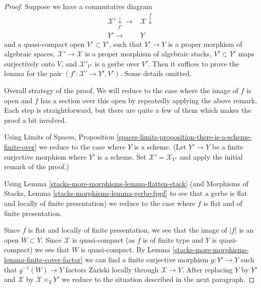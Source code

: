 \begin{proof}
Suppose we have a commutative diagram
$$
\begin{array}{cc}\mathcal{X}' \underset{f'}{\downarrow}\longrightarrow & \mathcal{X} \overset{f}{\downarrow} \\ Y' \longrightarrow & Y\end{array}
$$
and a quasi-compact open $V' \subset Y'$, such that
$Y' \to Y$ is a proper morphism of algebraic spaces,
$\mathcal{X}' \to \mathcal{X}$ is a proper morphism of algebraic stacks,
$V' \subset Y'$ maps surjectively onto $V$, and
$\mathcal{X}'_{V'}$ is a gerbe over $V'$.
Then it suffices to prove the lemma for the pair
$(f' : \mathcal{X}' \to Y', V')$. Some details omitted.

\medskip\noindent
Overall strategy of the proof. We will reduce
to the case where the image of $f$ is open and $f$
has a section over this open by repeatedly applying the
above remark. Each step is straightforward, but there are
quite a few of them which makes the proof a bit involved.

\medskip\noindent
Using Limits of Spaces, Proposition
\ref{spaces-limits-proposition-there-is-a-scheme-finite-over}
we reduce to the case where $Y$ is a scheme.
(Let $Y' \to Y$ be a finite surjective morphism where $Y'$ is
a scheme. Set $\mathcal{X}' = \mathcal{X}_{Y'}$ and apply
the initial remark of the proof.)

\medskip\noindent
Using Lemma \ref{stacks-more-morphisms-lemma-flatten-stack}
(and Morphisms of Stacks, Lemma \ref{stacks-morphisms-lemma-gerbe-fppf}
to see that a gerbe is flat and locally of finite presentation)
we reduce to the case where $f$ is flat and of finite presentation.

\medskip\noindent
Since $f$ is flat and locally of finite
presentation, we see that the image of $|f|$ is an open $W \subset Y$.
Since $\mathcal{X}$ is quasi-compact (as $f$ is of finite type
and $Y$ is quasi-compact) we see that $W$ is quasi-compact.
By Lemma \ref{stacks-more-morphisms-lemma-finite-cover-factor}
we can find a finite surjective morphism $g : Y' \to Y$
such that $g^{-1}(W) \to Y$ factors Zariski locally
through $\mathcal{X} \to Y$.
After replacing $Y$ by $Y'$ and $\mathcal{X}$ by
$\mathcal{X} \times_Y Y'$ we reduce to the situation
described in the next paragraph.


\end{proof}
